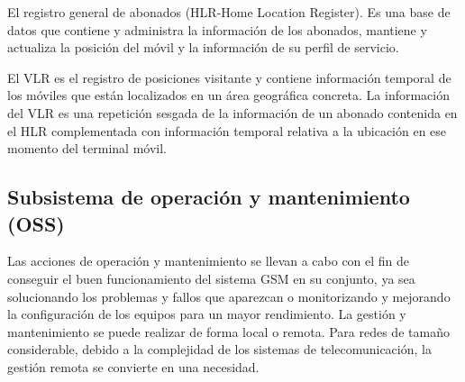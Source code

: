 El registro general de abonados (HLR-Home Location Register). Es una base de datos que contiene y administra la informaci\'on de los abonados, mantiene y actualiza la posici\'on del m\'ovil y la informaci\'on de su perfil de servicio.

El VLR es el registro de posiciones visitante y contiene informaci\'on temporal de los m\'oviles que est\'an localizados en un \'area geogr\'afica concreta. La informaci\'on del VLR es una repetici\'on sesgada de la informaci\'on de un abonado contenida en el HLR complementada con informaci\'on temporal relativa a la ubicaci\'on en ese momento del terminal m\'ovil.

\subsection{Subsistema de operaci\'on y mantenimiento (OSS)}
Las acciones de operaci\'on y mantenimiento se llevan a cabo con el fin de conseguir el buen funcionamiento del sistema GSM en su conjunto, ya sea solucionando los problemas y fallos que aparezcan o monitorizando y mejorando la configuraci\'on de los equipos para un mayor rendimiento.
La gesti\'on y mantenimiento se puede realizar de forma local o remota. Para redes de tama\~no considerable, debido a la complejidad de los sistemas de telecomunicaci\'on, la gesti\'on remota se convierte en una necesidad.
